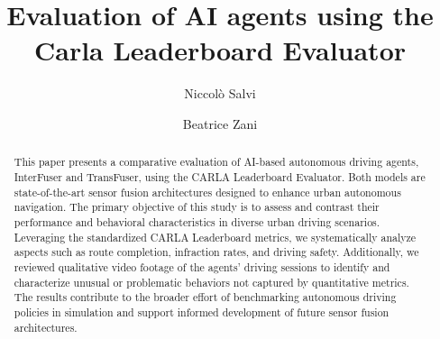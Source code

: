 \documentclass[sigconf]{acmart}
\begin{document}
\newcommand{\dav}[1]{\textcolor{cyan}{\textbf{[DH] #1}}}
\newcommand{\nic}[1]{\textcolor{green}{\textbf{[NS] #1}}}
\newcommand{\bea}[1]{\textcolor{orange}{\textbf{[BZ] #1}}}

\title[Evaluation of AI agents using the Carla Leaderboard Evaluator]{Evaluation of AI agents using the Carla Leaderboard Evaluator}

\author{Niccolò Salvi}

\author{Beatrice Zani}

\begin{abstract}
This paper presents a comparative evaluation of AI-based autonomous driving agents, InterFuser and TransFuser, using the CARLA Leaderboard Evaluator. Both models are state-of-the-art sensor fusion architectures designed to enhance urban autonomous navigation. The primary objective of this study is to assess and contrast their performance and behavioral characteristics in diverse urban driving scenarios. Leveraging the standardized CARLA Leaderboard metrics, we systematically analyze aspects such as route completion, infraction rates, and driving safety. Additionally, we reviewed qualitative video footage of the agents' driving sessions to identify and characterize unusual or problematic behaviors not captured by quantitative metrics. The results contribute to the broader effort of benchmarking autonomous driving policies in simulation and support informed development of future sensor fusion architectures.
\end{abstract}


\end{document}
